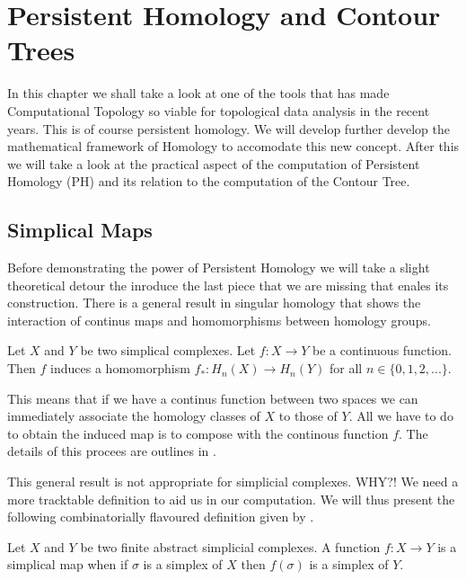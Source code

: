 \chapter{Persistent Homology and Contour Trees}
\label{chapter3}

In this chapter we shall take a look at one of the tools that has made Computational Topology so viable for topological data analysis in the recent years. This is of course persistent homology. We will develop further develop the mathematical framework of Homology to accomodate this new concept. After this we will take a look at the practical aspect of the computation of Persistent Homology (PH) and its relation to the computation of the Contour Tree.

\section{Simplical Maps}

Before demonstrating the power of Persistent Homology we will take a slight theoretical detour the inroduce the last piece that we are missing that enales its construction. There is a general result in singular homology that shows the interaction of continus maps and homomorphisms between homology groups.

\begin{defn} Let $X$ and $Y$ be two simplical complexes. Let $f: X \to Y$ be a continuous function. Then $f$ induces a homomorphism $f_*: H_n(X) \to H_n(Y)$ for all $n \in \{0, 1, 2, ...\}$. \end{defn}

This means that if we have a continus function between two spaces we can immediately associate the homology classes of $X$ to those of $Y$. All we have to do to obtain the induced map is to compose with the continous function $f$. The details of this procees are outlines in \cite{algebraic-topology}.


This general result is not appropriate for simplicial complexes. WHY?! We need a more tracktable definition to aid us in our computation. We will thus present the following combinatorially flavoured definition given by \cite{combinatorial-algebraic-topology}. 


\begin{defn} Let $X$ and $Y$ be two finite abstract simplicial complexes. A function $f: X \to Y$ is a simplical map when if $\sigma$ is a simplex of $X$ then $f(\sigma)$ is a simplex of $Y$. \end{defn}

